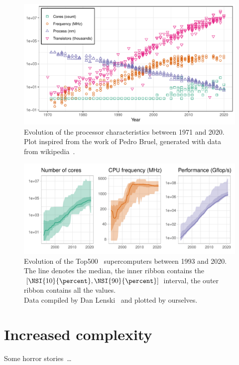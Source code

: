         \begin{figure}[htbp]
            \centering
            \includegraphics[width=\textwidth]{img/context/49_years.pdf}
            \caption{\label{fig:context:49_years}
            Evolution of the processor characteristics between 1971 and 2020. Plot inspired from the work of Pedro Bruel,
            generated with data from wikipedia~\cite{wiki2021chronology,wiki2021transistor}.}
        \end{figure}


        \begin{figure}[htbp]
            \centering
            \includegraphics[width=\textwidth]{img/context/top500.pdf}
            \caption{\label{fig:context:top500}
            Evolution of the Top500~\cite{top500} supercomputers between 1993 and 2020.  The line denotes the median, the inner ribbon
            contains the \([\NSI{10}{\percent}, \NSI{90}{\percent}]\) interval, the outer ribbon contains all the
            values.\\ Data compiled by Dan Lenski~\cite{top500_compiled} and plotted by ourselves.}
        \end{figure}


    \section{Increased complexity}%
    \label{sec:increased_complexity}

        Some horror stories~\cite{Petrini_2003}\dots
